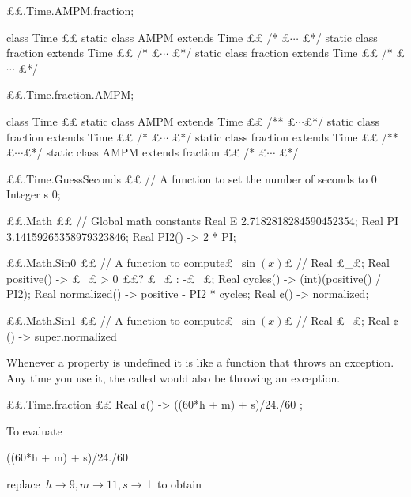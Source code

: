 
\begin{reap}
££.Time.AMPM.fraction;
\end{reap}

\begin{java}
class Time {££
  static class AMPM extends Time {££
    /* £$⋯$ £*/
    static class fraction extends Time {££ /* £$⋯$ £*/}
  }
  static class fraction extends Time {££ /* £$⋯$ £*/}
}
\end{java}

\begin{reap}
££.Time.fraction.AMPM;
\end{reap}

\begin{java}
class Time {££
  static class AMPM extends Time {££
    /** £$⋯$£*/
    static class fraction extends Time {££ /* £$⋯$ £*/}
  }
  static class fraction extends Time {££
    /** £$⋯$£*/
    static class AMPM extends fraction {££ /* £$⋯$ £*/}
  }
}
\end{java}

\begin{reap}
££.Time.GuessSeconds {££ // A function to set the number of seconds to 0
  Integer s 0;
} 
\end{reap}

\begin{reap}
££.Math {££ // Global math constants 
  Real E   2.7182818284590452354;
  Real PI  3.14159265358979323846;
  Real PI2() -> 2 * PI; 
}
\end{reap}


\begin{reap}
££.Math.Sin0 {££ // A function to compute£~$\sin(x)$£ //
  Real £\_£;
  Real positive() -> £\_£ > 0 ££? £\_£ : -£\_£;
  Real cycles() -> (int)(positive() / PI2);
  Real normalized() -> positive - PI2 * cycles;
  Real ¢() -> normalized;
}
\end{reap}

\begin{reap}
££.Math.Sin1 {££ // A function to compute£~$\sin(x)$£ //
  Real £\_£;
  Real ¢() -> super.normalized
}
\end{reap}


Whenever a property is undefined it is like a function that throws an exception.
Any time you use it, the called would also be throwing an exception.
\begin{reap}
££.Time.fraction {££
  Real ¢() -> ((60*h + m) + s)/24./60 ;
}
\end{reap}
To evaluate
\begin{java}
  ((60*h + m) + s)/24./60
\end{java}
replace~$h→9, m→11, s→⊥$
to obtain

